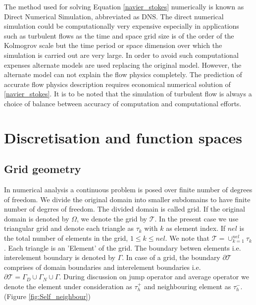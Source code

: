\documentclass[a4paper,openany]{book}
\begin{document}
The method used for solving Equation \eqref{navier_stokes} numerically is known as Direct Numerical Simulation, abbreviated as DNS. The direct numerical simulation could be computationally very expensive especially in applications such as turbulent flows as the time and space grid size is of the order of the Kolmogrov scale but the time period or space dimension over which the simulation is carried out are very large. In order to avoid such computational expenses alternate models are used replacing the original model. However, the alternate model can not explain the flow physics completely. The prediction of accurate flow physics description requires economical numerical solution of \eqref{navier_stokes}. It is to be noted that the simulation of turbulent flow is always a choice of balance between accuracy of computation and computational efforts.

\chapter{Discretisation and function spaces}

\section{Grid geometry}

In numerical analysis a continuous problem is posed over finite number of degrees of freedom. We divide the original domain into smaller subdomains to have finite number of degrres of freedom. The divided domain is called grid. If the original domain is denoted by $\Omega$, we denote the grid by $\mathcal{T}$. In the present case we use triangular grid and denote each triangle as $\tau_k$ with $k$ as element index. If $nel$ is the total number of elements in the grid, $1\leq k \leq nel$. We note that $\mathcal{T} = \cup_{k=1}^{nel} \tau_k$. Each triangle is an 'Element' of the grid. The boundary betwen elements i.e. interelement boundary is denoted by $\Gamma$. In case of a grid, the boundary $\partial \mathcal{T}$ comprises of domain boundaries and interelement boundaries i.e. $\partial \mathcal{T} = \Gamma_D \cup \Gamma_N \cup \Gamma$. During discussion on jump operator and average operator we denote the element under consideration as $\tau_{h}^+$ and neighbouring element as $\tau_{h}^-$. (Figure \ref{fig:Self_neighbour})
\end{document}
